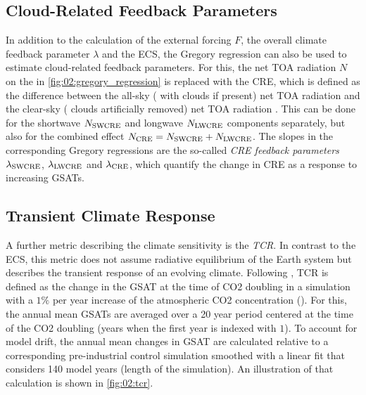 \subsection{Cloud-Related Feedback Parameters}
\label{subsec:02:cloud_feedback_parameters}

In addition to the calculation of the external forcing $F$, the overall climate
feedback parameter $\lambda$ and the \ac{ECS}, the Gregory regression can also
be used to estimate cloud-related feedback parameters. For this, the net
\ac{TOA} radiation $N$ on the \yaxis{} in \cref{fig:02:gregory_regression} is
replaced with the \ac{CRE}, which is defined as the difference between the
all-sky (\ie{} with clouds if present) net \ac{TOA} radiation and the clear-sky
(\ie{} clouds artificially removed) net \ac{TOA} radiation
\autocite{Andrews2012}. This can be done for the shortwave $N_{\textnormal{SWCRE}}$
and longwave $N_{\textnormal{LWCRE}}$ components separately, but also for the
combined effect $N_{\textnormal{CRE}} = N_{\textnormal{SWCRE}} + N_{\textnormal{LWCRE}}$. The
slopes in the corresponding Gregory regressions are the so-called
\emph{\ac{CRE} feedback parameters} $\lambda_{\textnormal{SWCRE}}$,
$\lambda_{\textnormal{LWCRE}}$ and $\lambda_{\textnormal{CRE}}$, which quantify the
change in \ac{CRE} as a response to increasing \acp{GSAT}.


\subsection{Transient Climate Response}
\label{subsec:02:tcr}

A further metric describing the climate sensitivity is the \emph{\ac{TCR}}. In
contrast to the \ac{ECS}, this metric does not assume radiative equilibrium of
the Earth system but describes the transient response of an evolving climate.
Following \textcite{Bindoff2013}, \ac{TCR} is defined as the change in the
\ac{GSAT} at the time of \ac{CO2} doubling in a simulation with a $1 \unit{\%}$
per year increase of the atmospheric \ac{CO2} concentration (\onepctcotwo{}).
For this, the annual mean \acp{GSAT} are averaged over a 20 year period
centered at the time of the \ac{CO2} doubling (years  when the
first year is indexed with $1$). To account for model drift, the annual mean
changes in \ac{GSAT} are calculated relative to a corresponding pre-industrial
control simulation smoothed with a linear fit that considers 140 model years
(length of the \onepctcotwo{} simulation). An illustration of that calculation
is shown in \cref{fig:02:tcr}.


